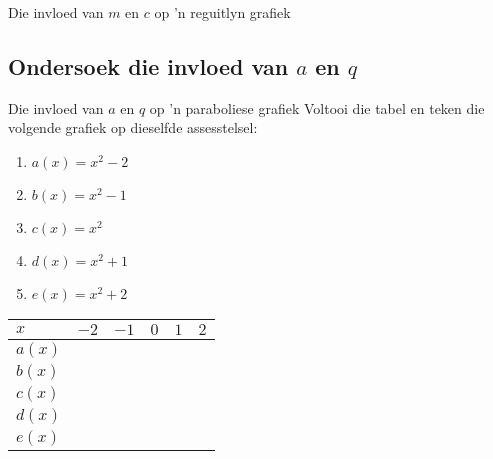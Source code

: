 \begin{Ondersoek}{Die invloed van $m$ en $c$ op 'n reguitlyn grafiek}
\subsection*{Ondersoek die invloed van $a$ en $q$ }
\begin{Ondersoek}{Die invloed van $a$ en $q$ op 'n paraboliese grafiek}
Voltooi die tabel en teken die volgende grafiek op dieselfde assesstelsel:
    \begin{enumerate}[noitemsep, label=\textbf{\arabic*}. ] 
  \item $a(x)={x}^{2}-2$
    \item $b(x)={x}^{2}-1$
    \item $c(x)={x}^{2}$
    \item $d(x)={x}^{2}+1$
    \item $e(x)={x}^{2}+2$
        \end{enumerate}

\begin{table}[H]
\begin{center}

\noindent

\begin{tabular}{|l|l|l|l|l|l|}\hline
 $x$&
$-2$&
$-1$&
$0$&
$1$&
$2$
\\ \hline


$a(x)$
&
&
&
&
&
\\ \hline

$b(x)$
&
&
&
&
&
\\ \hline

$c(x)$
&
&
&
&
&
\\ \hline

$d(x)$
&
&
&
&
&
\\ \hline

$e(x)$
&
&
&
&
&
\\ \hline


\end{tabular}
\end{center}
\end{table}
\end{Ondersoek}
\end{Ondersoek}
